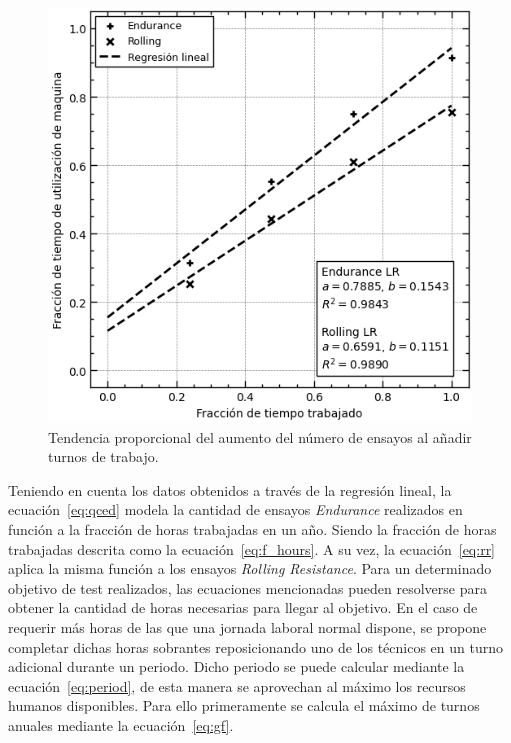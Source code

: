 \begin{figure}[H]
	\begin{center}
		\includegraphics{fig/4_sctr_time_sat}
	\end{center}
	\caption{Tendencia proporcional del aumento del número de ensayos al añadir turnos de trabajo.}
	\label{fig:4_sctr_time_sat}
\end{figure}

Teniendo en cuenta los datos obtenidos a través de la regresión lineal,
la ecuación~\eqref{eq:qced} modela la cantidad de ensayos \textit{Endurance}
realizados en función a la fracción de horas trabajadas en un año.
Siendo la fracción de horas trabajadas descrita
como la ecuación~\eqref{eq:f_hours}.
A su vez, la ecuación~\eqref{eq:rr} aplica la misma función
a los ensayos \textit{Rolling Resistance}.
Para un determinado objetivo de test realizados,
las ecuaciones mencionadas pueden resolverse
para obtener la cantidad de horas necesarias para llegar al objetivo.
En el caso de requerir más horas de las que una jornada laboral normal dispone,
se propone completar dichas horas sobrantes
reposicionando uno de los técnicos en un turno adicional durante un periodo.
Dicho periodo se puede calcular mediante la ecuación~\eqref{eq:period},
de esta manera se aprovechan al máximo los recursos humanos disponibles.
Para ello primeramente se calcula
el máximo de turnos anuales mediante la ecuación~\eqref{eq:gf}.

